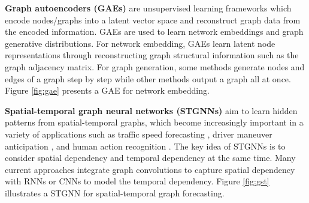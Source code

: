     \vspace{1mm}\noindent\textbf{Graph autoencoders (GAEs)} are unsupervised learning frameworks which encode nodes/graphs into a latent vector space and reconstruct graph data from the encoded information. GAEs are used to learn network embeddings and graph generative distributions. For network embedding, GAEs learn latent node representations through reconstructing graph structural information such as the graph adjacency matrix. For graph generation, some methods generate nodes and edges of a graph step by step while other methods output a graph all at once. Figure \ref{fig:gae} presents a GAE for network embedding.
    

	
    \vspace{1mm}\noindent\textbf{Spatial-temporal graph neural networks (STGNNs)} aim to learn hidden patterns from spatial-temporal graphs, which become increasingly important in a variety of applications such as traffic speed forecasting \cite{li2018diffusion}, driver maneuver anticipation \cite{jain2016structural}, and  human action recognition \cite{yan2018spatial}. 
    The key idea of STGNNs is to consider spatial dependency and temporal dependency at the same time. Many current approaches integrate graph convolutions to capture spatial dependency with RNNs or CNNs to model the temporal dependency. Figure \ref{fig:gst} illustrates a STGNN for spatial-temporal graph forecasting.

